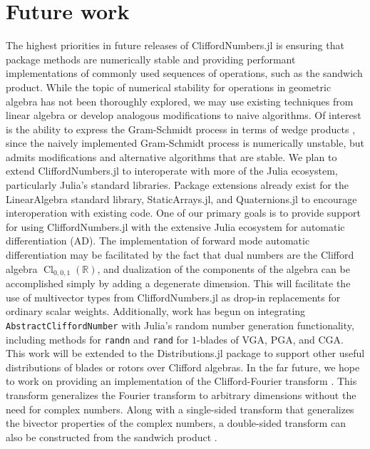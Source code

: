 \documentclass{juliacon}
\DeclareMathOperator{\Cl}{Cl}
\newcommand{\ClR}[1]{\Cl_{#1}\left(\mathbb{R}\right)}
\begin{document}
\section{Future work}

The highest priorities in future releases of CliffordNumbers.jl is ensuring that package methods are numerically stable and providing performant implementations of commonly used sequences of operations, such as the sandwich product.
While the topic of numerical stability for operations in geometric algebra has not been thoroughly explored, we may use existing techniques from linear algebra or develop analogous modifications to naive algorithms.
Of interest is the ability to express the Gram-Schmidt process in terms of wedge products \cite{GA4P}, since the naively implemented Gram-Schmidt process is numerically unstable, but admits modifications and alternative algorithms that are stable. We plan to extend CliffordNumbers.jl to interoperate with more of the Julia ecosystem, particularly Julia's standard libraries.
Package extensions already exist for the LinearAlgebra standard library,  StaticArrays.jl, and Quaternions.jl to encourage interoperation with existing code.
One of our primary goals is to provide support for using CliffordNumbers.jl with the extensive Julia ecosystem for automatic differentiation (AD).
The implementation of forward mode automatic differentiation may be facilitated by the fact that dual numbers are the Clifford algebra $\ClR{0,0,1}$, and dualization of the components of the algebra can be accomplished simply by adding a degenerate dimension. This will facilitate the use of multivector types from CliffordNumbers.jl as drop-in replacements for ordinary scalar weights. Additionally, work has begun on integrating \texttt{AbstractCliffordNumber} with Julia's random number generation functionality, including methods for \texttt{randn} and \texttt{rand} for $1$-blades of VGA, PGA, and CGA.
This work will be extended to the Distributions.jl package \cite{JSSv098i16} to support other useful distributions of blades or rotors over Clifford algebras. In the far future, we hope to work on providing an implementation of the Clifford-Fourier transform \cite{clifford-fourier}. This transform generalizes the Fourier transform to arbitrary dimensions without the need for complex numbers.
Along with a single-sided transform that generalizes the bivector properties of the complex numbers, a double-sided transform can also be constructed from the sandwich product \cite{double-sided-clifford-fourier}.
\end{document}
